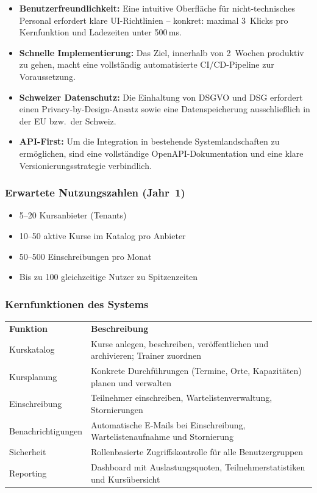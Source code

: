 \begin{itemize}[leftmargin=1.5em]
  \item \textbf{Benutzerfreundlichkeit:} Eine intuitive Oberfläche für nicht-technisches Personal
  erfordert klare UI-Richtlinien – konkret: maximal 3~Klicks pro Kernfunktion und
  Ladezeiten unter 500\,ms.

  \item \textbf{Schnelle Implementierung:} Das Ziel, innerhalb von 2~Wochen produktiv zu gehen,
  macht eine vollständig automatisierte CI/CD-Pipeline zur Voraussetzung.

  \item \textbf{Schweizer Datenschutz:} Die Einhaltung von DSGVO und DSG erfordert einen
  Privacy-by-Design-Ansatz sowie eine Datenspeicherung ausschließlich in der EU
  bzw.\ der Schweiz.

  \item \textbf{API-First:} Um die Integration in bestehende Systemlandschaften zu ermöglichen,
  sind eine vollständige OpenAPI-Dokumentation und eine klare Versionierungsstrategie
  verbindlich.
\end{itemize}


\subsubsection{Erwartete Nutzungszahlen (Jahr~1)}
\begin{itemize}[leftmargin=1.5em]
  \item 5--20 Kursanbieter (Tenants)
  \item 10--50 aktive Kurse im Katalog pro Anbieter
  \item 50--500 Einschreibungen pro Monat
  \item Bis zu 100 gleichzeitige Nutzer zu Spitzenzeiten
\end{itemize}

\subsubsection{Kernfunktionen des Systems}

\begin{tabularx}{\textwidth}{L{3cm} X}
  \color{white}\textbf{Funktion} & \color{white}\textbf{Beschreibung} \\
  Kurskatalog & Kurse anlegen, beschreiben, veröffentlichen und archivieren; Trainer zuordnen \\
  Kursplanung & Konkrete Durchführungen (Termine, Orte, Kapazitäten) planen und verwalten \\
  Einschreibung & Teilnehmer einschreiben, Wartelistenverwaltung, Stornierungen \\
  Benachrichtigungen & Automatische E-Mails bei Einschreibung, Wartelistenaufnahme und Stornierung \\
  Sicherheit & Rollenbasierte Zugriffskontrolle für alle Benutzergruppen \\
  Reporting & Dashboard mit Auslastungsquoten, Teilnehmerstatistiken und Kursübersicht \\
\end{tabularx}

